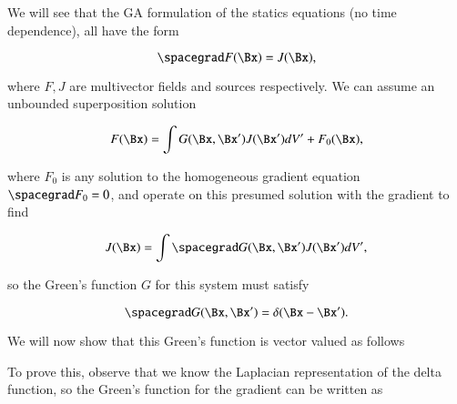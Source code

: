 %
%


We will see that the GA formulation of the statics equations (no time dependence), all have the form

\begin{dmath}\label{eqn:gradientGreensFunctionEuclidean:420}
\spacegrad F(\Bx) = J(\Bx),
\end{dmath}

where \( F, J \) are multivector fields and sources respectively.  We can assume an unbounded superposition solution

\begin{dmath}\label{eqn:gradientGreensFunctionEuclidean:440}
F(\Bx) = \int G(\Bx, \Bx') J(\Bx') dV' + F_0(\Bx),
\end{dmath}

where \( F_0 \) is any solution to the homogeneous gradient equation \( \spacegrad F_0 = 0 \), and operate on this presumed solution with the gradient to find

\begin{dmath}\label{eqn:gradientGreensFunctionEuclidean:460}
J(\Bx)
= \int \spacegrad G(\Bx, \Bx') J(\Bx') dV',
\end{dmath}

so the Green's function \( G \) for this system must satisfy

\begin{dmath}\label{eqn:gradientGreensFunctionEuclidean:480}
\spacegrad G(\Bx, \Bx') = \delta( \Bx - \Bx' ).
\end{dmath}

We will now show that this Green's function is vector valued as follows


To prove this, observe that we know the Laplacian representation of the delta function, so
the Green's function for the gradient can be written as


